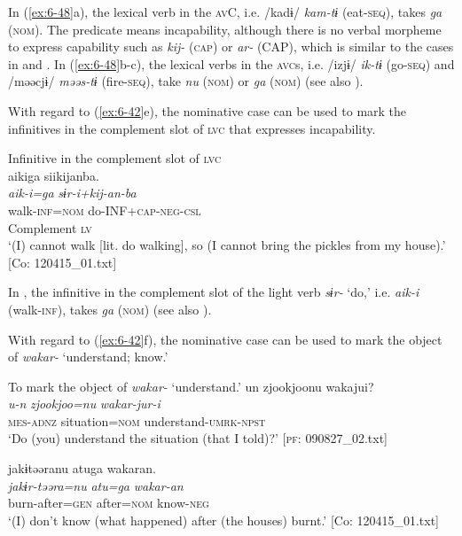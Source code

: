In (\ref{ex:6-48}a), the lexical verb in the \textsc{av}C, i.e. /kadɨ/ \textit{kam-tɨ} (eat-\textsc{seq}), takes \textit{ga} (\textsc{nom}). The predicate means incapability, although there is no verbal morpheme to express capability such as \textit{kij-} (\textsc{cap}) or \textit{ar-} (CAP), which is similar to the cases in  and . In (\ref{ex:6-48}b-c), the lexical verbs in the \textsc{avc}s, i.e. /izjɨ/ \textit{ik-tɨ} (go-\textsc{seq}) and /məəcjɨ/ \textit{məəs-tɨ} (fire-\textsc{seq}), take \textit{nu} (\textsc{nom}) or \textit{ga} (\textsc{nom}) (see also ).

With regard to (\ref{ex:6-42}e), the nominative case can be used to mark the infinitives in the complement slot of \textsc{lvc} that expresses incapability.

\ea\label{ex:6-49}
 Infinitive in the complement slot of \textsc{lvc}\\

{\TM}
\gllll aikiga  siikijanba.\\
\textit{aik-i=ga}  \textit{sɨr-i+kij-an-ba}\\
    walk-\textsc{inf}=\textsc{nom}  do-INF+\textsc{cap}-\textsc{neg}-\textsc{csl}\\
    Complement  \textsc{lv}\\
\glt    ‘(I) cannot walk [lit. do walking], so (I cannot bring the pickles from my house).’
  [Co: 120415\_01.txt]
\z

In , the infinitive in the complement slot of the light verb \textit{sɨr-} ‘do,’ i.e. \textit{aik-i} (walk-\textsc{inf}), takes \textit{ga} (\textsc{nom}) (see also ).

  With regard to (\ref{ex:6-42}f), the nominative case can be used to mark the object of \textit{wakar-} ‘understand; know.’

\ea\label{ex:6-50}
  To mark the object of \textit{wakar-} ‘understand.’
 \ea
 {\TM}
\glll  un  {\textbar}zjookjoo{\textbar}nu  wakajui?\\
\textit{u-n}  \textit{zjookjoo=nu}  \textit{wakar-jur-i}\\
\textsc{mes}-\textsc{adnz}  situation=\textsc{nom}  understand-\textsc{umrk}-\textsc{npst}\\
\glt ‘Do (you) understand the situation (that I told)?’ [\textsc{pf}: 090827\_02.txt]

\ex
{\TM}
\glll jakɨtəəranu  atuga  wakaran.\\
\textit{jakɨr-təəra=nu}  \textit{atu=ga}  \textit{wakar-an}\\
burn-after=\textsc{gen}  after=\textsc{nom}  know-\textsc{neg}\\
\glt ‘(I) don’t know (what happened) after (the houses) burnt.’ [Co: 120415\_01.txt]
\z
\z

